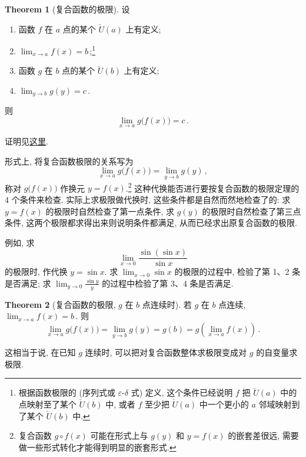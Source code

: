 \documentclass{book}
\newcommand{\compose}{\circ}
\newcommand{\puncU}[1]{\check{U}\!\left( #1 \right)}
\numberwithin{equation}{section}
\numberwithin{figure}{section}
\theoremstyle{definition}
\newtheorem{theorem}{Theorem}[section]
\begin{document}
\begin{theorem}[复合函数的极限]
  设
  \begin{enumerate}
    \item 函数 $f$ 在 $a$ 点的某个 $\puncU{a}$ 上有定义;
    \item $\lim_{x\to a}f(x)=b$\,;\footnote{根据函数极限的 (序列式或 $\varepsilon$-$\delta$ 式) 定义, 这个条件已经说明 $f$ 把 $\puncU{a}$ 中的点映射至了某个 $\puncU{b}$ 中, 或者 $f$ 至少把 $\puncU{a}$ 中一个更小的 $a$ 邻域映射到了某个 $\puncU{b}$ 中.}
    \item 函数 $g$ 在 $b$ 点的某个 $\puncU{b}$ 上有定义;
    \item $\lim_{y\to b}g(y)=c$\,.
  \end{enumerate}
  则
  \begin{equation*}
    \lim_{x\to a}g\big(f(x)\big)=c\,.
  \end{equation*}
  \label{the:CompositeFunctionLimit}
\end{theorem}
证明见\hyperlink{proof:CompositeFunctionLimit}{这里}.

形式上, 将复合函数极限的关系写为
\begin{equation*}
  \lim_{x\to a}g \big( f(x) \big)=\lim_{y\to b}g(y)\,,
\end{equation*}
称对 $g \big( f(x) \big)$ 作换元 $y=f(x)$.\footnote{复合函数 $g\compose f(x)$ 可能在形式上与 $g(y)$ 和 $y=f(x)$ 的嵌套差很远, 需要做一些形式转化才能得到明显的嵌套形式.} 这种代换能否进行要按复合函数的极限定理的 4 个条件来检查. 实际上求极限做代换时, 这些条件都是自然而然地检查了的: 求 $y=f(x)$ 的极限时自然检查了第一点条件, 求 $g(y)$ 的极限时自然检查了第三点条件, 这两个极限都求得出来则说明条件都满足, 从而已经求出原复合函数的极限.

例如, 求
\begin{equation*}
  \lim_{x\to 0}\frac{\sin(\sin x)}{\sin x}
\end{equation*}
的极限时, 作代换 $y=\sin x$. 求 $\lim_{x\to 0}\sin x$ 的极限的过程中, 检验了第 1、2 条是否满足; 求 $\lim_{y\to 0}\frac{\sin y}{y}$ 的过程中检验了第 3、4 条是否满足.

\begin{theorem}[复合函数的极限, $g$ 在 $b$ 点连续时]
  若 $g$ 在 $b$ 点连续, $\lim_{x\to a}f(x)=b$\,. 则
  \begin{equation*}
    \lim_{x\to a}g\big( f(x) \big)=\lim_{y\to b}g(y)=g(b)=g\left( \lim_{x\to a}f(x) \right)\,.
  \end{equation*}
\end{theorem}
这相当于说, 在已知 $g$ 连续时, 可以把对复合函数整体求极限变成对 $g$ 的自变量求极限.
\end{document}
